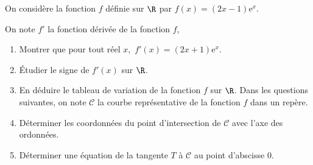 \medskip

On considère la fonction $f$ définie sur $\R$ par $f(x) = \left (2x - 1\right )\text{e}^x$.

On note $f'$ la fonction dérivée de la fonction $f$,

\medskip

\begin{enumerate}
\item Montrer que pour tout réel $x$,\, $f'(x) = \left (2x + 1\right )\text{e}^x$.
\item Étudier le signe de $f'(x)$ sur $\R$.
\item En déduire le tableau de variation de la fonction $f$ sur $\R$. Dans les questions suivantes, on note $\mathcal C$ la courbe représentative de la fonction $f$ dans un repère.
\item Déterminer les coordonnées du point d'intersection de $\mathcal C$ avec l'axe des ordonnées. 
\item Déterminer une équation de la tangente $T$ à $\mathcal C$ au point d'abscisse $0$.
\end{enumerate}

\bigskip
